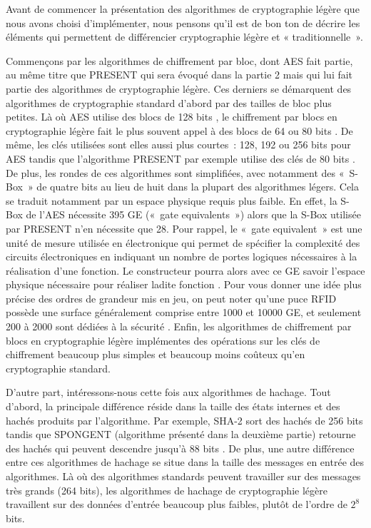 			Avant de commencer la présentation des algorithmes de cryptographie légère que
		nous avons choisi d’implémenter, nous pensons qu’il est de bon ton de décrire
		les éléments qui permettent de différencier cryptographie légère et «
		traditionnelle ».

			Commençons par les algorithmes de chiffrement par bloc, dont AES fait partie,
		au même titre que PRESENT qui sera évoqué dans la partie 2 mais qui lui fait
		partie des algorithmes de cryptographie légère. Ces derniers se démarquent des
		algorithmes de cryptographie standard d’abord par des tailles de bloc plus
		petites. Là où AES utilise des blocs de 128 bits \cite{AES-FIPS}, le
		chiffrement par blocs en cryptographie légère fait le plus souvent appel à des
		blocs de 64 ou 80 bits \cite{Report_light}. De même, les clés utilisées sont
		elles aussi plus courtes : 128, 192 ou 256 bits pour AES \cite{AES-FIPS}
		tandis que l’algorithme PRESENT par exemple utilise des clés de 80 bits
		\cite{PRESENT}. De plus, les rondes de ces algorithmes sont simplifiées, avec
		notamment des « S-Box » de quatre bits au lieu de huit dans la plupart des
		algorithmes légers. Cela se traduit notamment par un espace physique requis
		plus faible. En effet, la S-Box de l’AES nécessite 395 GE \cite{RFID} (« gate
		equivalents ») alors que la S-Box utilisée par PRESENT n’en nécessite que 28.
		Pour rappel, le « gate equivalent » est une unité de mesure utilisée en
		électronique qui permet de spécifier la complexité des circuits électroniques
		en indiquant un nombre de portes logiques nécessaires à la réalisation d’une
		fonction. Le constructeur pourra alors avec ce GE savoir l’espace physique
		nécessaire pour réaliser ladite fonction \cite{wiki_gate}. Pour vous donner
		une idée plus précise des ordres de grandeur mis en jeu, on peut noter qu’une
		puce RFID possède une surface généralement comprise entre 1000 et 10000 GE, et
		seulement 200 à 2000 sont dédiées à la sécurité \cite{Report_light}. Enfin,
		les algorithmes de chiffrement par blocs en cryptographie légère implémentes
		des opérations sur les clés de chiffrement beaucoup plus simples et beaucoup
		moins coûteux qu’en cryptographie standard.

			D’autre part, intéressons-nous cette fois aux algorithmes de hachage. Tout
		d’abord, la principale différence réside dans la taille des états internes et
		des hachés produits par l’algorithme. Par exemple, SHA-2 sort des hachés de
		256 bits tandis que SPONGENT (algorithme présenté dans la deuxième partie)
		retourne des hachés qui peuvent descendre jusqu’à 88 bits \cite{6275435}. De
		plus, une autre différence entre ces algorithmes de hachage se situe dans la
		taille des messages en entrée des algorithmes. Là où des algorithmes standards
		peuvent travailler sur des messages très grands (264 bits), les algorithmes de
		hachage de cryptographie légère travaillent sur des données d’entrée beaucoup
		plus faibles, plutôt de l’ordre de $2^8$ bits.

